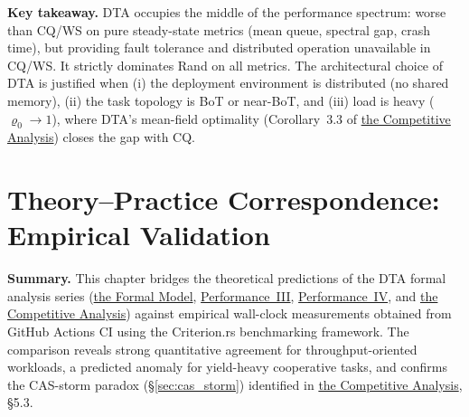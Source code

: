 \documentclass[11pt,a4paper]{article}
\begin{document}
\noindent
\textbf{Key takeaway.}
DTA occupies the middle of the performance spectrum: worse than
CQ/WS on pure steady-state metrics (mean queue, spectral gap, crash time),
but providing fault tolerance and distributed operation unavailable in CQ/WS.
It strictly dominates Rand on all metrics.  The architectural choice of
DTA is justified when (i) the deployment environment is distributed
(no shared memory), (ii) the task topology is BoT or near-BoT,
and (iii) load is heavy ($\varrho_0 \to 1$), where DTA's mean-field
optimality (Corollary~3.3 of \hyperref[chap:competitive_ratio]{the Competitive Analysis}) closes the
gap with CQ.


\section*{Theory--Practice Correspondence: Empirical Validation}
\label{chap:empirical}
\setcounter{section}{0}

\textbf{Summary.}
This chapter bridges the theoretical predictions of the DTA formal
analysis series (\hyperref[chap:formal_model]{the Formal Model},
\hyperref[chap:makespan]{Performance~III},
\hyperref[chap:stability]{Performance~IV},
and \hyperref[chap:competitive_ratio]{the Competitive Analysis})
against empirical wall-clock measurements obtained from GitHub Actions CI
using the Criterion.rs benchmarking framework.
The comparison reveals strong quantitative agreement for throughput-oriented
workloads, a predicted anomaly for yield-heavy cooperative tasks, and
confirms the CAS-storm paradox (\S\ref{sec:cas_storm})
identified in \hyperref[chap:competitive_ratio]{the Competitive Analysis},
\S5.3.
\end{document}
